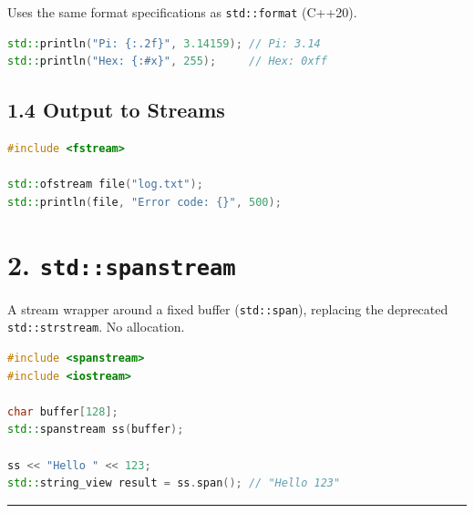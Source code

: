 Uses the same format specifications as
\passthrough{\lstinline!std::format!} (C++20).

\begin{lstlisting}[language={C++}]
std::println("Pi: {:.2f}", 3.14159); // Pi: 3.14
std::println("Hex: {:#x}", 255);     // Hex: 0xff
\end{lstlisting}

\hypertarget{output-to-streams}{%
\subsection{1.4 Output to Streams}\label{output-to-streams}}

\begin{lstlisting}[language={C++}]
#include <fstream>

std::ofstream file("log.txt");
std::println(file, "Error code: {}", 500);
\end{lstlisting}

\hypertarget{stdspanstream}{%
\section{\texorpdfstring{2.
\texttt{std::spanstream}}{2. std::spanstream}}\label{stdspanstream}}

A stream wrapper around a fixed buffer
(\passthrough{\lstinline!std::span!}), replacing the deprecated
\passthrough{\lstinline!std::strstream!}. No allocation.

\begin{lstlisting}[language={C++}]
#include <spanstream>
#include <iostream>

char buffer[128];
std::spanstream ss(buffer);

ss << "Hello " << 123;
std::string_view result = ss.span(); // "Hello 123"
\end{lstlisting}

\begin{center}\rule{0.5\linewidth}{0.5pt}\end{center}
